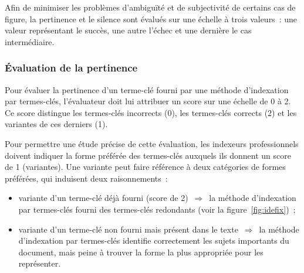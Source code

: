       Afin de minimiser les problèmes d'ambiguïté et de subjectivité de certains
      cas de figure, la pertinence et le silence sont évalués sur une échelle à
      trois valeurs~: une valeur représentant le succès, une autre l'échec et
      une dernière le cas intermédiaire.

      \subsubsection{Évaluation de la pertinence}
      \label{subsubsec:main-automatic_evaluation_of_keyphrase_annotation-methodology-evaluation_protocol-relevancy}
        Pour évaluer la pertinence d'un terme-clé fourni par une méthode
        d'indexation par termes-clés, l'évaluateur doit lui attribuer un score
        sur une échelle de 0 à 2. Ce score distingue les termes-clés incorrects
        (0), les termes-clés corrects (2) et les variantes de ces derniers (1).

        Pour permettre une étude précise de cette évaluation, les indexeurs
        professionnels doi\-vent indiquer la forme préférée des termes-clés
        auxquels ils donnent un score de 1 (variantes). Une variante peut faire
        référence à deux catégories de formes préférées, qui induisent deux
        raisonnements~:
        \begin{itemize}
          \item{variante d'un terme-clé déjà fourni (score de
                2)~$\Rightarrow$~la méthode d'indexation par termes-clés fourni
                des termes-clés redondants (voir la figure~\ref{fig:idefix})~;}
          \item{variante d'un terme-clé non fourni mais présent dans le
                texte~$\Rightarrow$~la méthode d'indexation par termes-clés
                identifie correctement les sujets importants du document, mais
                peine à trouver la forme la plus appropriée pour les
                représenter.}
        \end{itemize}

